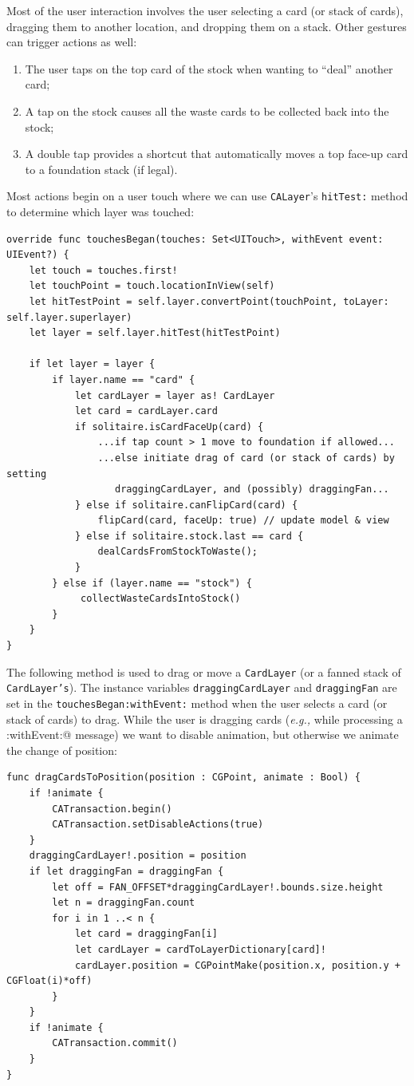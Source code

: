 \documentclass[11pt]{article}
\begin{document}
Most of the user interaction involves the user selecting a card (or stack
of cards), dragging them to another location, and dropping them on
a stack. Other gestures can trigger actions as well:
\begin{enumerate}
\item The user taps on the top card of the stock when wanting to
  ``deal'' another card;
\item A tap on the stock causes all the waste cards to be collected
  back into the stock;
\item A double tap provides a shortcut that automatically moves a
  top face-up card to a foundation stack (if legal).
\end{enumerate}
Most actions begin on a user touch where we can use 
{\tt CALayer}'s {\tt hitTest:} method to determine which layer was touched:
\begin{verbatim}
override func touchesBegan(touches: Set<UITouch>, withEvent event: UIEvent?) {
    let touch = touches.first!
    let touchPoint = touch.locationInView(self)
    let hitTestPoint = self.layer.convertPoint(touchPoint, toLayer: self.layer.superlayer)
    let layer = self.layer.hitTest(hitTestPoint)
        
    if let layer = layer {
        if layer.name == "card" {
            let cardLayer = layer as! CardLayer
            let card = cardLayer.card
            if solitaire.isCardFaceUp(card) {
                ...if tap count > 1 move to foundation if allowed...
                ...else initiate drag of card (or stack of cards) by setting
                   draggingCardLayer, and (possibly) draggingFan...
            } else if solitaire.canFlipCard(card) {
                flipCard(card, faceUp: true) // update model & view
            } else if solitaire.stock.last == card {
                dealCardsFromStockToWaste();
            } 
        } else if (layer.name == "stock") {
             collectWasteCardsIntoStock()
        }
    }
}
\end{verbatim}
The following method is used to drag or move a {\tt CardLayer} (or a fanned stack of
{\tt CardLayer's}). The instance variables
{\tt draggingCardLayer} and {\tt draggingFan} are set
in the {\tt touchesBegan:withEvent:} method when the user selects
a card (or stack of cards) to drag.
While the user is dragging cards 
({\it e.g.,} while processing a \verb@touchesMoved:withEvent:@ message)
we want to disable animation, 
but otherwise we animate the change of position:
\begin{verbatim}
func dragCardsToPosition(position : CGPoint, animate : Bool) {
    if !animate {
        CATransaction.begin()
        CATransaction.setDisableActions(true)
    }
    draggingCardLayer!.position = position
    if let draggingFan = draggingFan {
        let off = FAN_OFFSET*draggingCardLayer!.bounds.size.height
        let n = draggingFan.count
        for i in 1 ..< n {
            let card = draggingFan[i]
            let cardLayer = cardToLayerDictionary[card]!
            cardLayer.position = CGPointMake(position.x, position.y + CGFloat(i)*off)
        }
    }
    if !animate {
        CATransaction.commit()
    }
}
\end{verbatim}
\end{document}
